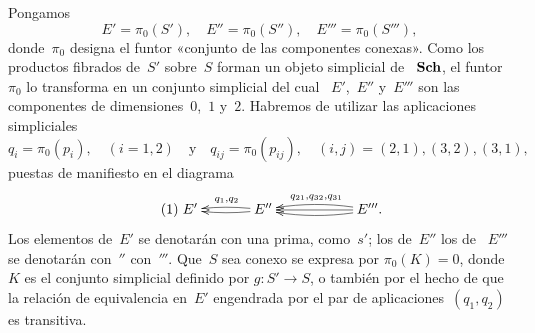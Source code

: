 Pongamos
$$
E'=\pi_0(S'), \quad E''=\pi_0(S''), \quad E'''=\pi_0(S'''),
$$
donde~$\pi_0$ designa el funtor «conjunto de las componentes conexas». Como
los productos fibrados de~$S'$ sobre~$S$ forman un objeto simplicial de
~$\mathbf{Sch}$, el funtor~$\pi_0$ lo transforma en un conjunto simplicial del cual
~$E'$,~$E''$ y~$E'''$ son las componentes de dimensiones~$0$,~$1$ y~$2$.
Habremos
de utilizar las aplicaciones simpliciales
$$
q_i=\pi_0(p_i),\quad(i=1,2)\quad\text{y}
\quad q_{ij}=\pi_0(p_{ij}),\quad (i,j)=(2,1),(3,2),(3,1),
$$
puestas de manifiesto en el diagrama
\begin{equation*}
\label{eq:IX.5.1}
\tag{1} {\xymatrix@C=.5cm{ E' && \ar@/^2pt/[ll] \ar@/_2pt/[ll]_{q_1,q_2} E'' &&&
\ar@/^4pt/[lll] \ar[lll] \ar@/_4pt/[lll]_{q_{21},q_{32},q_{31}} E'''. }}
\end{equation*}
Los elementos
de~$E'$ se denotarán con una prima, como~$s'$; los de~$E''$ \resp los de
~$E'''$ se denotarán con~$''$ \resp con~$'''$. Que~$S$ sea conexo se expresa por
$\pi_0(K)=0$, donde~$K$ es el conjunto simplicial definido por
$g\colon S'\to S$, o también por el hecho de que la relación de equivalencia
en~$E'$ engendrada por el par de aplicaciones~$(q_1,q_2)$ es transitiva.

